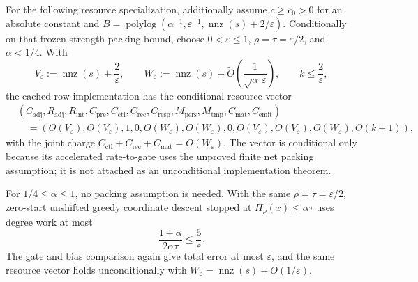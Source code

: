 \begin{corollary}
For the following resource specialization, additionally assume
$c\geq c_0>0$ for an absolute constant and
$B=\operatorname{polylog}(\alpha^{-1},\varepsilon^{-1},
\operatorname{nnz}(s)+2/\varepsilon)$.
Conditionally on that frozen-strength packing bound, choose
$0<\varepsilon\leq1$, $\rho=\tau=\varepsilon/2$, and $\alpha<1/4$.  With
\begin{equation*}
 V_\varepsilon:=\operatorname{nnz}(s)+\frac2\varepsilon,
 \qquad
 W_\varepsilon:=\operatorname{nnz}(s)
   +\widetilde O\left(\frac1{\sqrt\alpha\,\varepsilon}\right),
 \qquad k\leq\frac2\varepsilon,
\end{equation*}
the cached-row implementation has the conditional resource vector
\begin{equation}
 \begin{split}
 &(C_{\mathrm{adj}},R_{\mathrm{adj}},R_{\mathrm{int}},C_{\mathrm{pre}},
 C_{\mathrm{ctl}},C_{\mathrm{rec}},C_{\mathrm{resp}},M_{\mathrm{pers}},
 M_{\mathrm{tmp}},C_{\mathrm{mat}},C_{\mathrm{emit}})\\
 &\quad=
 (O(V_\varepsilon),O(V_\varepsilon),1,0,
 O(W_\varepsilon),O(W_\varepsilon),0,
 O(V_\varepsilon),O(V_\varepsilon),O(W_\varepsilon),\Theta(k+1)),
 \end{split}
 \label{eq:aesp-cd-frozen-conditional-vector}
\end{equation}
with the joint charge
$C_{\mathrm{ctl}}+C_{\mathrm{rec}}+C_{\mathrm{mat}}=O(W_\varepsilon)$.
The vector is conditional only because its accelerated rate-to-gate uses the
unproved finite net packing assumption; it is not attached as an
unconditional implementation theorem.

For $1/4\leq\alpha\leq1$, no packing assumption is needed.  With the same
$\rho=\tau=\varepsilon/2$, zero-start unshifted greedy coordinate descent
stopped at $H_\rho(x)\leq\alpha\tau$ uses degree work at most
\begin{equation}
 \frac{1+\alpha}{2\alpha\tau}\leq\frac5\varepsilon.
 \label{eq:aesp-cd-frozen-fallback-work}
\end{equation}
The gate and bias comparison again give total error at most $\varepsilon$,
and the same resource vector holds unconditionally with
$W_\varepsilon=\operatorname{nnz}(s)+O(1/\varepsilon)$.
\end{corollary}

